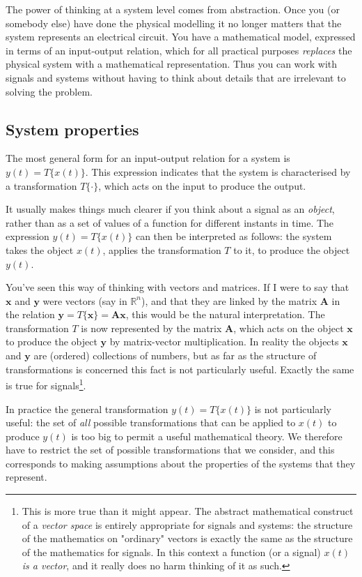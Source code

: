 \documentclass[10pt]{beamer}
\begin{document}
The power of thinking at a system level comes from abstraction.  Once you (or somebody else) have done the physical modelling it no longer matters that the system represents an electrical circuit.  You have a mathematical model, expressed in terms of an input-output relation, which for all practical purposes {\em replaces} the physical system with a mathematical representation.  Thus you can work with signals and systems without having to think about details that are irrelevant to solving the problem.

\subsection{System properties}
The most general form for an input-output relation for a system is $y(t) = T\{x(t)\}$.  This expression indicates that the system is characterised by a transformation $T\{\cdot\}$, which acts on the input to produce the output.  

It usually makes things much clearer if you think about a signal as an {\em object}, rather than as a set of values of a function for different instants in time.  The expression $y(t) = T\{x(t)\}$ can then be interpreted as follows:  the system takes the object $x(t)$, applies the transformation $T$ to it, to produce the object $y(t)$.  

You've seen this way of thinking with vectors and matrices.  If I were to say that $\mathbf{x}$ and $\mathbf{y}$ were vectors (say in $\mathbb{R}^n$), and that they are linked by the matrix $\mathbf{A}$ in the relation $\mathbf{y} = T\{\mathbf{x}\} = \mathbf{A} \mathbf{x}$, this would be the natural interpretation.  The transformation $T$ is now represented by the matrix $\mathbf{A}$, which acts on the object $\mathbf{x}$ to produce the object $\mathbf{y}$ by matrix-vector multiplication.  In reality the objects $\mathbf{x}$ and $\mathbf{y}$ are (ordered) collections of numbers, but as far as the structure of transformations is concerned this fact is not particularly useful.  Exactly the same is true for signals\footnote{This is more true than it might appear.  The abstract mathematical construct of a {\em vector space} is entirely appropriate for signals and systems:  the structure of the mathematics on "ordinary" vectors is exactly the same as the structure of the mathematics for signals.  In this context a function (or a signal) $x(t)$ {\em is a vector}, and it really does no harm thinking of it as such.}.

In practice the general transformation $y(t) = T\{x(t)\}$ is not particularly useful:  the set of {\em all} possible transformations that can be applied to $x(t)$ to produce $y(t)$ is too big to permit a useful mathematical theory.  We therefore have to restrict the set of possible transformations that we consider, and this corresponds to making assumptions about the properties of the systems that they represent.
\end{document}
